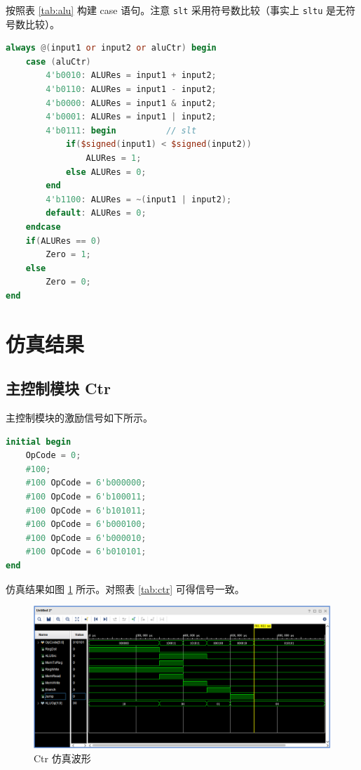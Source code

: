 \documentclass[a4paper,UTF8]{ctexart}
\begin{document}
按照表 \ref{tab:alu} 构建 case 语句。注意 \verb"slt" 采用符号数比较（事实上 \verb"sltu" 是无符号数比较）。
\begin{lstlisting}[language=verilog,caption=ALU.v]
always @(input1 or input2 or aluCtr) begin
    case (aluCtr)
        4'b0010: ALURes = input1 + input2;
        4'b0110: ALURes = input1 - input2;
        4'b0000: ALURes = input1 & input2;
        4'b0001: ALURes = input1 | input2;
        4'b0111: begin          // slt
            if($signed(input1) < $signed(input2))
                ALURes = 1;
            else ALURes = 0; 
        end
        4'b1100: ALURes = ~(input1 | input2);
        default: ALURes = 0;
    endcase
    if(ALURes == 0)
        Zero = 1;
    else
        Zero = 0;
end
\end{lstlisting}

\section{仿真结果}

\subsection{主控制模块 Ctr}

主控制模块的激励信号如下所示。
\begin{lstlisting}[language=verilog,caption={Ctr\_tb.v}]
initial begin
    OpCode = 0;
    #100;
    #100 OpCode = 6'b000000;
    #100 OpCode = 6'b100011;
    #100 OpCode = 6'b101011;
    #100 OpCode = 6'b000100;
    #100 OpCode = 6'b000010;
    #100 OpCode = 6'b010101;
end
\end{lstlisting}

仿真结果如图 \ref{fig:ctr} 所示。对照表 \ref{tab:ctr} 可得信号一致。
\begin{figure}[H]
    \centering\includegraphics[width=\textwidth]{figure1.png}\caption{Ctr 仿真波形}\label{fig:ctr}
\end{figure}
\end{document}
